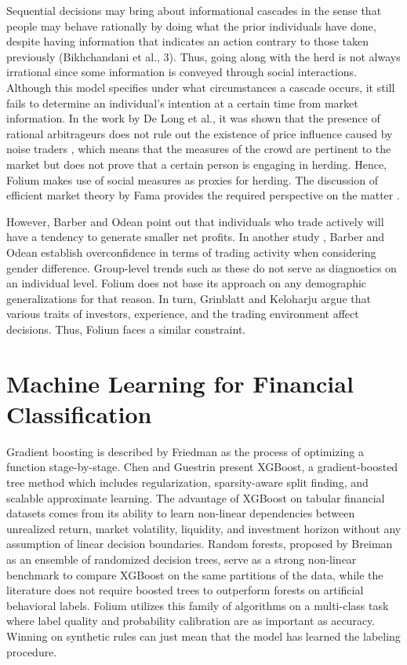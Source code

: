 Sequential decisions may bring about informational cascades in the sense that people may behave rationally by doing what the prior individuals have done, despite having information that indicates an action contrary to those taken previously (Bikhchandani et al., 3)\cite{b3}. Thus, going along with the herd is not always irrational since some information is conveyed through social interactions. Although this model specifies under what circumstances a cascade occurs, it still fails to determine an individual's intention at a certain time from market information. In the work by De Long et al., it was shown that the presence of rational arbitrageurs does not rule out the existence of price influence caused by noise traders  \cite{b19}, which means that the measures of the crowd are pertinent to the market but does not prove that a certain person is engaging in herding. Hence, Folium makes use of social measures as proxies for herding. The discussion of efficient market theory by Fama provides the required perspective on the matter \cite{b20}.

However, Barber and Odean \cite{b14} point out that individuals who trade actively will have a tendency to generate smaller net profits. In another study \cite{b15}, Barber and Odean establish overconfidence in terms of trading activity when considering gender difference. Group-level trends such as these do not serve as diagnostics on an individual level. Folium does not base its approach on any demographic generalizations for that reason. In turn, Grinblatt and Keloharju \cite{b16} argue that various traits of investors, experience, and the trading environment affect decisions. Thus, Folium faces a similar constraint.

\section{Machine Learning for Financial Classification}
Gradient boosting is described by Friedman \cite{b26} as the process of optimizing a function stage-by-stage. Chen and Guestrin \cite{b5} present XGBoost, a gradient-boosted tree method which includes regularization, sparsity-aware split finding, and scalable approximate learning. The advantage of XGBoost on tabular financial datasets comes from its ability to learn non-linear dependencies between unrealized return, market volatility, liquidity, and investment horizon without any assumption of linear decision boundaries. Random forests, proposed by Breiman \cite{b25} as an ensemble of randomized decision trees, serve as a strong non-linear benchmark to compare XGBoost on the same partitions of the data, while the literature does not require boosted trees to outperform forests on artificial behavioral labels. Folium utilizes this family of algorithms on a multi-class task where label quality and probability calibration are as important as accuracy. Winning on synthetic rules can just mean that the model has learned the labeling procedure.

